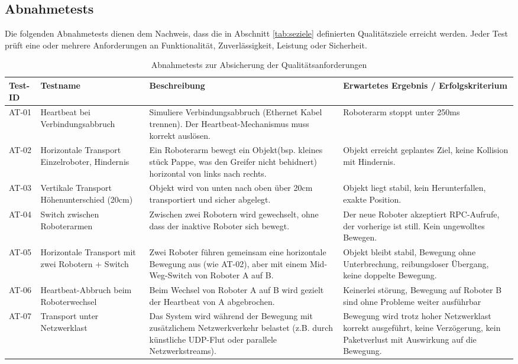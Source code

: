 \subsection{Abnahmetests}
 
Die folgenden Abnahmetests dienen dem Nachweis, dass die in Abschnitt \ref{tab:seziele} definierten Qualitätsziele erreicht werden. Jeder Test prüft eine oder mehrere Anforderungen an Funktionalität, Zuverlässigkeit, Leistung oder Sicherheit.
 
\begin{table}[h!]
\centering
\begin{tabular}{p{1.6cm}|p{4cm}|p{5.5cm}|p{5.5cm}}
\hline
\textbf{Test-ID} & \textbf{Testname} & \textbf{Beschreibung} & \textbf{Erwartetes Ergebnis / Erfolgskriterium} \\
\hline
AT-01 & Heartbeat bei Verbindungsabbruch & Simuliere Verbindungsabbruch (Ethernet Kabel trennen). Der Heartbeat-Mechanismus muss korrekt auslösen. & Roboterarm stoppt unter 250ms\\
\hline
AT-02 & Horizontale Transport Einzelroboter, Hindernis & Ein Roboterarm bewegt ein Objekt(bsp. kleines stück Pappe, was den Greifer nicht behidnert) horizontal von links nach rechts. & Objekt erreicht geplantes Ziel, keine Kollision mit Hindernis.\\
\hline
AT-03 & Vertikale Transport  Höhenunterschied (20cm) & Objekt wird von unten nach oben über 20cm transportiert und sicher abgelegt. & Objekt liegt stabil, kein Herunterfallen, exakte Position. \\
\hline
AT-04 & Switch zwischen Roboterarmen & Zwischen zwei Robotern wird gewechselt, ohne dass der inaktive Roboter sich bewegt. & Der neue Roboter akzeptiert RPC-Aufrufe, der vorherige ist still. Kein ungewolltes Bewegen. \\
\hline
AT-05 & Horizontale Transport mit zwei Robotern + Switch & Zwei Roboter führen gemeinsam eine horizontale Bewegung aus (wie AT-02), aber mit einem Mid-Weg-Switch von Roboter A auf B. & Objekt bleibt stabil, Bewegung ohne Unterbrechung, reibungsloser Übergang, keine doppelte Bewegung. \\
\hline
AT-06 & Heartbeat-Abbruch beim Roboterwechsel & Beim Wechsel von Roboter A auf B wird gezielt der Heartbeat von A abgebrochen. & Keinerlei störung, Bewegung auf Roboter B sind ohne Probleme weiter ausführbar\\
\hline
AT-07 & Transport unter Netzwerklast & Das System wird während der Bewegung mit zusätzlichem Netzwerkverkehr belastet (z.B. durch künstliche UDP-Flut oder parallele Netzwerkstreams). & Bewegung wird trotz hoher Netzwerklast korrekt ausgeführt, keine Verzögerung, kein Paketverlust mit Auswirkung auf die Bewegung. \\
\hline
\end{tabular}
\caption{Abnahmetests zur Absicherung der Qualitätsanforderungen}
\label{tab:abnahmetests}
\end{table}
 
 
 
